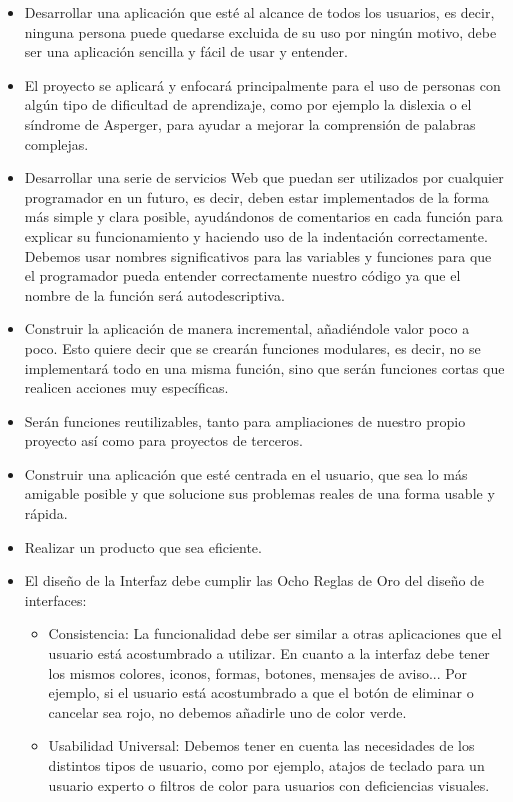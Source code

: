 \begin{itemize}
	\item Desarrollar una aplicación que esté al alcance de todos los usuarios, es decir, ninguna persona puede quedarse excluida de su uso por ningún motivo, debe ser una aplicación sencilla y fácil de usar y entender.
	\item El proyecto se aplicará y enfocará principalmente para el uso de personas con algún tipo de dificultad de aprendizaje, como por ejemplo la dislexia o el síndrome de Asperger, para ayudar a mejorar la comprensión de palabras complejas.
	\item Desarrollar una serie de servicios Web que puedan ser utilizados por cualquier programador en un futuro, es decir, deben estar implementados de la forma más simple y clara posible, ayudándonos de comentarios en cada función para explicar su funcionamiento y haciendo uso de la indentación correctamente. Debemos usar nombres significativos para las variables y funciones para que el programador pueda entender correctamente nuestro código ya que el nombre de la función será autodescriptiva.
	\item Construir la aplicación de manera incremental, añadiéndole valor poco a poco. Esto quiere decir que se crearán funciones modulares, es decir, no se implementará todo en una misma función, sino que serán funciones cortas que realicen acciones muy específicas. 
	\item Serán funciones reutilizables, tanto para ampliaciones de nuestro propio proyecto así como para proyectos de terceros.
	\item Construir una aplicación que esté centrada en el usuario, que sea lo más amigable posible y que solucione sus problemas reales de una forma usable y rápida.
	\item Realizar un producto que sea eficiente.
	\item El diseño de la Interfaz debe cumplir las Ocho Reglas de Oro del diseño de interfaces:
	\begin{itemize} 
		\item Consistencia: La funcionalidad debe ser similar a otras aplicaciones que el usuario está acostumbrado a utilizar. En cuanto a la interfaz debe tener los mismos colores, iconos, formas, botones, mensajes de aviso... Por ejemplo, si el usuario está acostumbrado a que el botón de eliminar o cancelar sea rojo, no debemos añadirle uno de color verde.
		\item Usabilidad Universal: Debemos tener en cuenta las necesidades de los distintos tipos de usuario, como por ejemplo, atajos de teclado para un usuario experto o filtros de color para usuarios con deficiencias visuales.

\end{itemize}
\end{itemize}
